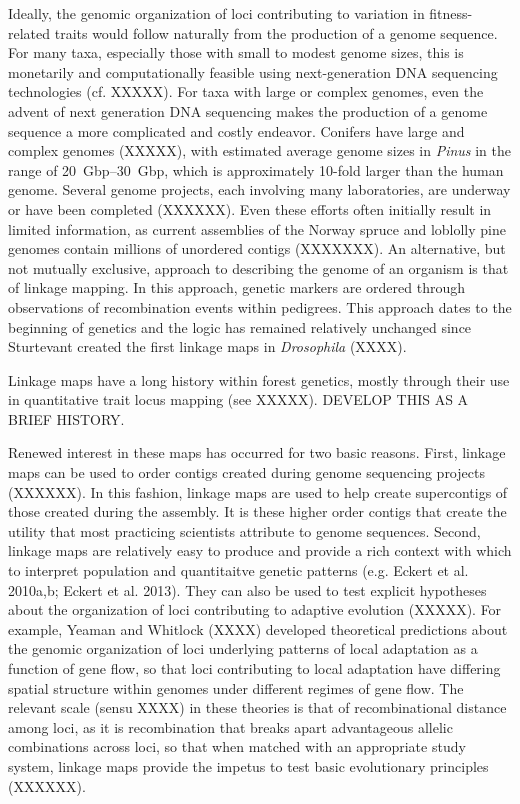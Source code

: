 \documentclass[11pt]{article}
\begin{document}
Ideally, the genomic organization of loci contributing to variation in fitness-related traits would 
follow naturally from the production of a genome sequence. For many taxa, especially those 
with small to modest genome sizes,
this is monetarily and computationally feasible using next-generation DNA sequencing technologies (cf. XXXXX). For taxa with large or complex
genomes, even the advent of next generation DNA sequencing makes the production of a genome sequence 
a more complicated and costly endeavor. Conifers have large and complex genomes (XXXXX), with estimated average genome sizes in \textit{Pinus} in the range of \SIrange{20}{30}{Gbp},
which is approximately 10-fold larger than the human genome. 
Several genome projects, each involving many laboratories, are
underway or have been completed (XXXXXX). Even these efforts often initially 
result in limited information, as current assemblies of the Norway spruce and
loblolly pine genomes contain millions of unordered contigs (XXXXXXX). An alternative, 
but not mutually exclusive, approach to describing the genome of an
organism is that of linkage mapping. In this approach, genetic markers are ordered through 
observations of recombination events within pedigrees. This approach
dates to the beginning of genetics and the logic has remained relatively unchanged since 
Sturtevant created the first linkage maps in \textit{Drosophila} (XXXX). 

Linkage maps have a long history within forest genetics, mostly through their use in quantitative trait locus
mapping (see XXXXX). DEVELOP THIS AS A BRIEF HISTORY. 

Renewed interest in these maps has occurred for two basic reasons. First, linkage maps can be used 
to order contigs created during genome sequencing projects (XXXXXX). In this fashion, linkage maps are
used to help create supercontigs of those created during the assembly. It is these higher order contigs that
create the utility that most practicing scientists attribute to genome sequences.  Second, linkage maps are 
relatively easy to produce and provide a rich context with which to interpret
population and quantitaitve genetic patterns (e.g. Eckert et al. 2010a,b; Eckert et al. 2013). 
They can also be used to test explicit hypotheses about the organization of loci contributing to 
adaptive evolution (XXXXX). For example, Yeaman and Whitlock (XXXX) developed theoretical predictions
about the genomic organization of loci underlying patterns of local adaptation as a function of gene 
flow, so that loci contributing to local adaptation have differing spatial structure within genomes
under different regimes of gene flow. The relevant scale (sensu XXXX) in these theories is that of recombinational distance among loci,
as it is recombination that breaks apart advantageous allelic combinations across loci, so that when 
matched with an appropriate study system, linkage maps provide the impetus to test basic 
evolutionary principles (XXXXXX). 
\end{document}
